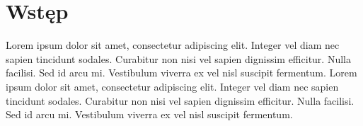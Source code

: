 \chapter*{Wstęp}

Lorem ipsum dolor sit amet, consectetur adipiscing elit. Integer vel diam nec sapien tincidunt sodales. Curabitur non nisi vel sapien dignissim efficitur. Nulla facilisi. Sed id arcu mi. Vestibulum viverra ex vel nisl suscipit fermentum. Lorem ipsum dolor sit amet, consectetur adipiscing elit. Integer vel diam nec sapien tincidunt sodales. Curabitur non nisi vel sapien dignissim efficitur. Nulla facilisi. Sed id arcu mi. Vestibulum viverra ex vel nisl suscipit fermentum.

